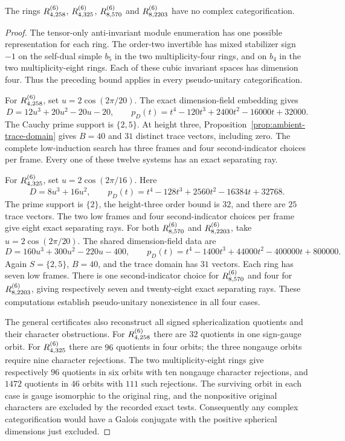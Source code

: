 \begin{theorem}
\label{thm:quartic-stabilizer}
The rings $R^{(6)}_{4,258}$, $R^{(6)}_{4,325}$, $R^{(6)}_{8,570}$ and
$R^{(6)}_{8,2203}$ have no complex
categorification.
\end{theorem}
\begin{proof}
The tensor-only anti-invariant module enumeration has one possible
representation for each ring. The order-two invertible has mixed
stabilizer sign $-1$ on the self-dual simple $b_5$ in the two
multiplicity-four rings, and on $b_4$ in the two multiplicity-eight
rings. Each of these cubic invariant spaces has dimension four.
Thus the preceding bound applies in every
pseudo-unitary categorification.

For $R^{(6)}_{4,258}$, set $u=2\cos(2\pi/20)$. The exact dimension-field
embedding gives
\[
 D=12u^3+20u^2-20u-20,\qquad
 p_D(t)=t^4-120t^3+2400t^2-16000t+32000.
\]
The Cauchy prime support is $\{2,5\}$. At height three,
Proposition~\ref{prop:ambient-trace-domain} gives $B=40$ and $31$
distinct trace vectors, including zero. The complete low-induction
search has three frames and four second-indicator choices per frame.
Every one of these twelve systems has an exact separating ray.

For $R^{(6)}_{4,325}$, set $u=2\cos(2\pi/16)$. Here
\[
 D=8u^3+16u^2,\qquad
 p_D(t)=t^4-128t^3+2560t^2-16384t+32768.
\]
The prime support is $\{2\}$, the height-three order bound is $32$,
and there are $25$ trace vectors. The two low frames and four
second-indicator choices per frame give eight exact separating rays.
For both $R^{(6)}_{8,570}$ and $R^{(6)}_{8,2203}$, take
$u=2\cos(2\pi/20)$. The shared dimension-field data are
\[
 D=160u^3+300u^2-220u-400,\qquad
 p_D(t)=t^4-1400t^3+44000t^2-400000t+800000.
\]
Again $S=\{2,5\}$, $B=40$, and the trace domain has $31$ vectors.
Each ring has seven low frames. There is one second-indicator choice
for $R^{(6)}_{8,570}$ and four for $R^{(6)}_{8,2203}$, giving respectively
seven and twenty-eight exact separating rays.
These computations establish pseudo-unitary nonexistence in all four
cases.

The general certificates also reconstruct all signed sphericalization
quotients and their character obstructions. For $R^{(6)}_{4,258}$ there
are $32$ quotients in one sign-gauge orbit. For $R^{(6)}_{4,325}$ there are
$96$ quotients in four orbits; the three nongauge orbits require nine
character rejections. The two multiplicity-eight rings give
respectively $96$ quotients in six orbits with ten nongauge character
rejections, and $1472$ quotients in $46$ orbits with $111$ such
rejections. The surviving orbit in each case is gauge
isomorphic to the original ring, and the nonpositive original
characters are excluded by the recorded exact tests. Consequently any
complex categorification would have a Galois conjugate with the
positive spherical dimensions just excluded.


\end{proof}
